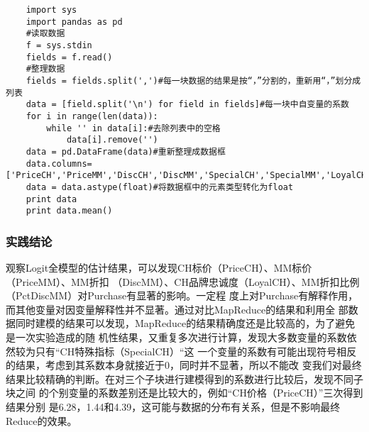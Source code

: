 \begin{lstlisting}
	import sys
	import pandas as pd
	#读取数据
	f = sys.stdin
	fields = f.read()
	#整理数据
	fields = fields.split(',')#每一块数据的结果是按“，”分割的，重新用“，”划分成列表
	data = [field.split('\n') for field in fields]#每一块中自变量的系数
	for i in range(len(data)):
	    while '' in data[i]:#去除列表中的空格
	        data[i].remove('')
	data = pd.DataFrame(data)#重新整理成数据框
	data.columns=['PriceCH','PriceMM','DiscCH','DiscMM','SpecialCH','SpecialMM','LoyalCH','Intercept']
	data = data.astype(float)#将数据框中的元素类型转化为float
	print data
	print data.mean()
\end{lstlisting}

\subsubsection{实践结论}\label{ux5b9eux8df5ux7ed3ux8bba}

观察Logit全模型的估计结果，可以发现CH标价（PriceCH）、MM标价（PriceMM）、MM折扣
（DiscMM）、CH品牌忠诚度（LoyalCH）、MM折扣比例（PctDiscMM）对Purchase有显著的影响。一定程
度上对Purchase有解释作用，而其他变量对因变量解释性并不显著。通过对比MapReduce的结果和利用全
部数据同时建模的结果可以发现，MapReduce的结果精确度还是比较高的，为了避免是一次实验造成的随
机性结果，又重复多次进行计算，发现大多数变量的系数依然较为只有``CH特殊指标（SpecialCH）``这
一个变量的系数有可能出现符号相反的结果，考虑到其系数本身就接近于0，同时并不显著，所以不能改
变我们对最终结果比较精确的判断。在对三个子块进行建模得到的系数进行比较后，发现不同子块之间
的个别变量的系数差别还是比较大的，例如``CH价格（PriceCH）''三次得到结果分别
是6.28，1.44和4.39，这可能与数据的分布有关系，但是不影响最终Reduce的效果。
